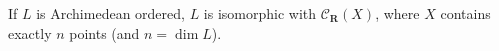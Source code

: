 If $L$ is Archimedean ordered, $L$ is isomorphic with $\mathcal{C}_{\mathbf{R}}(X)$, where $X$ contains exactly $n$ points (and $n = \dim L$).
